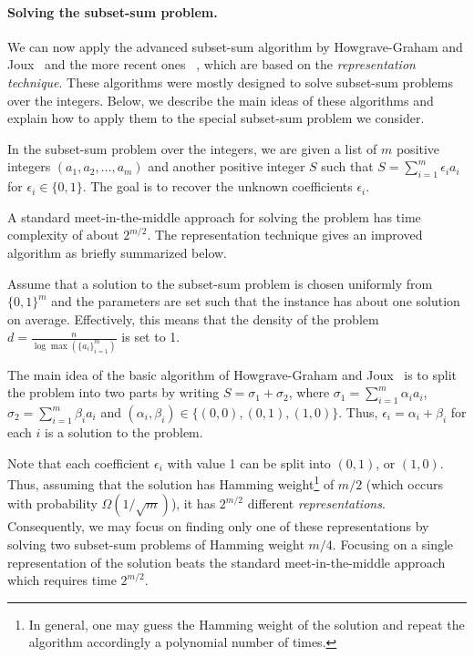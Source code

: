 \paragraph{Solving the subset-sum problem.}
We can now apply the advanced subset-sum algorithm by
Howgrave{-}Graham and Joux~\cite{Howgrave-GrahamJ10} and the more recent ones
~\cite{BeckerCJ11,BonnetainBSS20},
which are based on the \emph{representation technique}.
These algorithms were mostly designed to solve subset-sum problems over the integers.
Below, we describe the main ideas of these algorithms
and explain how to apply them to the special subset-sum problem
we consider.

In the subset-sum problem over the integers,
we are given a list of $m$ positive  integers $(a_1,a_2,\ldots,a_m)$
and another positive integer $S$ such that $S = \sum_{i=1}^{m} \epsilon_i a_i$
for $\epsilon_i \in \{0,1\}$. The goal is to recover the unknown coefficients $\epsilon_i$.

A standard meet-in-the-middle approach for solving the problem has time complexity of about $2^{m/2}$.
The representation technique gives an improved algorithm as briefly summarized below.

Assume that a solution to the subset-sum problem is chosen uniformly from $\{0,1\}^m$
and the parameters are set such that the instance has about one solution on average. Effectively, this means that the density of the problem $d = \tfrac{n}{\log \max(\{a_i\}_{i=1}^{m})}$ is set to 1.

The main idea of the basic algorithm of Howgrave{-}Graham and Joux~\cite{Howgrave-GrahamJ10}
is to split the problem into two parts by writing
$S = \sigma_1 + \sigma_2$,
where $\sigma_1 = \sum_{i=1}^{m} \alpha_i a_i$, $\sigma_2 = \sum_{i=1}^{m} \beta_i a_i$
and $(\alpha_i,\beta_i) \in \{(0,0),(0,1),(1,0)\}$.
Thus, $\epsilon_i = \alpha_i + \beta_i$ for each $i$ is a solution to the problem.

Note that each coefficient $\epsilon_i$ with value 1 can be split into $(0,1)$, or $(1,0)$.
Thus, assuming that the solution has Hamming weight\footnote{In general, one
may guess the Hamming weight of the solution and
repeat the algorithm accordingly a polynomial number of times.} of $m/2$
(which occurs with probability $\Omega(1/\sqrt{m})$),
it has $2^{m/2}$ different \emph{representations}.
Consequently, we may focus on finding only one of these representations
by solving two subset-sum problems of Hamming weight $m/4$.
Focusing on a single representation of the solution
beats the standard meet-in-the-middle approach which requires time $2^{m/2}$.

